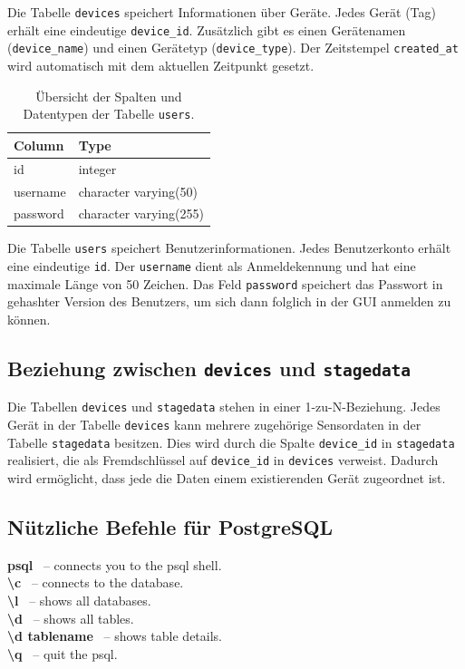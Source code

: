 Die Tabelle \texttt{devices} speichert Informationen über Geräte. Jedes Gerät (Tag) erhält eine eindeutige \texttt{device\_id}. Zusätzlich gibt es einen Gerätenamen (\texttt{device\_name}) und einen Gerätetyp (\texttt{device\_type}). Der Zeitstempel \texttt{created\_at} wird automatisch mit dem aktuellen Zeitpunkt gesetzt.

\begin{table}[h]
	\centering
	\begin{tabular}{|l|l|}
		\hline
		\textbf{Column} & \textbf{Type} \\
		\hline
		id & integer \\
		\hline
		username & character varying(50) \\
		\hline
		password & character varying(255) \\
		\hline
	\end{tabular}
	\caption{Übersicht der Spalten und Datentypen der Tabelle \texttt{users}.}
	\label{tab:users}
\end{table}

Die Tabelle \texttt{users} speichert Benutzerinformationen. Jedes Benutzerkonto erhält eine eindeutige \texttt{id}. Der \texttt{username} dient als Anmeldekennung und hat eine maximale Länge von 50 Zeichen. Das Feld \texttt{password} speichert das Passwort in gehashter Version des Benutzers, um sich dann folglich in der GUI anmelden zu können.

\subsection{Beziehung zwischen \texttt{devices} und \texttt{stagedata}}

Die Tabellen \texttt{devices} und \texttt{stagedata} stehen in einer 1-zu-N-Beziehung. Jedes Gerät in der Tabelle \texttt{devices} kann mehrere zugehörige Sensordaten in der Tabelle \texttt{stagedata} besitzen. Dies wird durch die Spalte \texttt{device\_id} in \texttt{stagedata} realisiert, die als Fremdschlüssel auf \texttt{device\_id} in \texttt{devices} verweist. Dadurch wird ermöglicht, dass jede die Daten einem existierenden Gerät zugeordnet ist. 

\subsection{Nützliche Befehle für PostgreSQL}
\textbf{psql} \ – connects you to the psql shell. \\
\textbf{\textbackslash{c}} \ – connects to the database. \\
\textbf{\textbackslash{l}} \ – shows all databases. \\
\textbf{\textbackslash{d}} \ – shows all tables. \\
\textbf{\textbackslash{d} tablename} \ – shows table details. \\
\textbf{\textbackslash{q}} \ – quit the psql.

